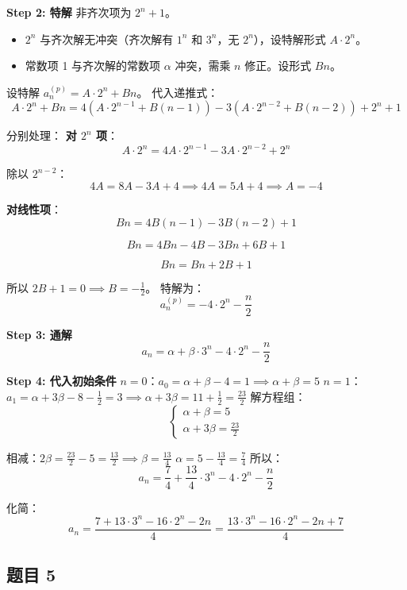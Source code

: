\documentclass[10pt,a4paper,openany]{ctexbook}
\theoremstyle{definition}
\theoremstyle{remark}
\begin{document}
\textbf{Step 2: 特解}
非齐次项为 $2^n + 1$。
\begin{itemize}
\item $2^n$ 与齐次解无冲突（齐次解有 $1^n$ 和 $3^n$，无 $2^n$），设特解形式 $A \cdot 2^n$。
\item 常数项 1 与齐次解的常数项 $\alpha$ 冲突，需乘 $n$ 修正。设形式 $Bn$。

\end{itemize}

设特解 $a_n^{(p)} = A \cdot 2^n + Bn$。
代入递推式：
\[
A \cdot 2^n + Bn = 4(A \cdot 2^{n-1} + B(n-1)) - 3(A \cdot 2^{n-2} + B(n-2)) + 2^n + 1
\]

分别处理：
\textbf{对 $2^n$ 项}：
\[
A \cdot 2^n = 4A \cdot 2^{n-1} - 3A \cdot 2^{n-2} + 2^n
\]

除以 $2^{n-2}$：
\[
4A = 8A - 3A + 4 \implies 4A = 5A + 4 \implies A = -4
\]

\textbf{对线性项}：
\[
Bn = 4B(n-1) - 3B(n-2) + 1
\]

\[
Bn = 4Bn - 4B - 3Bn + 6B + 1
\]

\[
Bn = Bn + 2B + 1
\]

所以 $2B + 1 = 0 \implies B = -\frac{1}{2}$。
特解为：
\[
a_n^{(p)} = -4 \cdot 2^n - \frac{n}{2}
\]

\textbf{Step 3: 通解}
\[
a_n = \alpha + \beta \cdot 3^n - 4 \cdot 2^n - \frac{n}{2}
\]

\textbf{Step 4: 代入初始条件}
$n = 0$：$a_0 = \alpha + \beta - 4 = 1 \implies \alpha + \beta = 5$
$n = 1$：$a_1 = \alpha + 3\beta - 8 - \frac{1}{2} = 3 \implies \alpha + 3\beta = 11 + \frac{1}{2} = \frac{23}{2}$
解方程组：
\[
\begin{cases}
\alpha + \beta = 5 \\
\alpha + 3\beta = \frac{23}{2}
\end{cases}
\]

相减：$2\beta = \frac{23}{2} - 5 = \frac{13}{2} \implies \beta = \frac{13}{4}$
$\alpha = 5 - \frac{13}{4} = \frac{7}{4}$
所以：
\[
a_n = \frac{7}{4} + \frac{13}{4} \cdot 3^n - 4 \cdot 2^n - \frac{n}{2}
\]

化简：
\[
a_n = \frac{7 + 13 \cdot 3^n - 16 \cdot 2^n - 2n}{4} = \frac{13 \cdot 3^n - 16 \cdot 2^n - 2n + 7}{4}
\]

\vspace{-2pt}

\subsection{题目 5}
\end{document}
